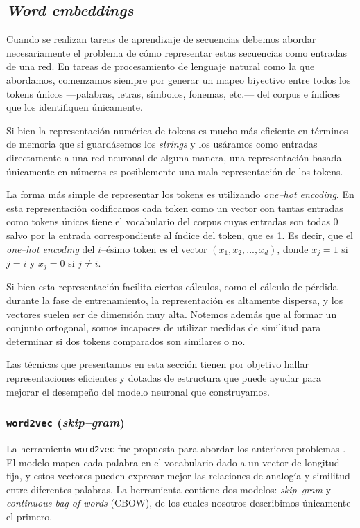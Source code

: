\documentclass[12pt]{article}
\newcommand{\code}{\texttt}
\begin{document}
\subsection{\textit{Word embeddings}}

Cuando se realizan tareas de aprendizaje de secuencias debemos abordar necesariamente el problema de cómo representar estas secuencias como entradas de una red. En tareas de procesamiento de lenguaje natural como la que abordamos, comenzamos siempre por generar un mapeo biyectivo entre todos los tokens únicos ---palabras, letras, símbolos, fonemas, etc.---  del corpus e índices que los identifiquen únicamente. 

Si bien la representación numérica de tokens es mucho más eficiente en términos de memoria que si guardásemos los \textit{strings} y los usáramos como entradas directamente a una red neuronal de alguna manera, una representación basada únicamente en números es posiblemente una mala representación de los tokens. 

La forma más simple de representar los tokens es utilizando \textit{one--hot encoding}. En esta representación codificamos cada token como un vector con tantas entradas como tokens únicos tiene el vocabulario del corpus cuyas entradas son todas 0 salvo por la entrada correspondiente al índice del token, que es 1. Es decir, que el \textit{one--hot encoding} del $ i $--ésimo token es el vector $ (x_1, x_2, ..., x_d) $, donde $ x_j = 1 $ si $ j = i $ y $ x_j = 0 $ si $ j \neq i $.

Si bien esta representación facilita ciertos cálculos, como el cálculo de pérdida durante la fase de entrenamiento, la representación es altamente dispersa, y los vectores suelen ser de dimensión muy alta. Notemos además que al formar un conjunto ortogonal, somos incapaces de utilizar medidas de similitud para determinar si dos tokens comparados son similares o no. 

Las técnicas que presentamos en esta sección tienen por objetivo hallar representaciones eficientes y dotadas de estructura que puede ayudar para mejorar el desempeño del modelo neuronal que construyamos.

\subsubsection{\code{word2vec} (\textit{skip--gram})}

La herramienta \code{word2vec} fue propuesta para abordar los anteriores problemas \parencite{Mikolov2013}. El modelo mapea cada palabra en el vocabulario dado a un vector de longitud fija, y estos vectores pueden expresar mejor las relaciones de analogía y similitud entre diferentes palabras. La herramienta contiene dos modelos: \textit{skip--gram} y \textit{continuous bag of words} (CBOW), de los cuales nosotros describimos únicamente el primero.
\end{document}
